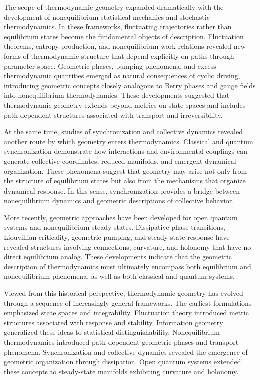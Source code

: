 The scope of thermodynamic geometry expanded dramatically with the development of nonequilibrium statistical mechanics and stochastic thermodynamics. In these frameworks, fluctuating trajectories rather than equilibrium states become the fundamental objects of description. Fluctuation theorems, entropy production, and nonequilibrium work relations revealed new forms of thermodynamic structure that depend explicitly on paths through parameter space. Geometric phases, pumping phenomena, and excess thermodynamic quantities emerged as natural consequences of cyclic driving, introducing geometric concepts closely analogous to Berry phases and gauge fields into nonequilibrium thermodynamics. These developments suggested that thermodynamic geometry extends beyond metrics on state spaces and includes path-dependent structures associated with transport and irreversibility.

At the same time, studies of synchronization and collective dynamics revealed another route by which geometry enters thermodynamics. Classical and quantum synchronization demonstrate how interactions and environmental couplings can generate collective coordinates, reduced manifolds, and emergent dynamical organization. These phenomena suggest that geometry may arise not only from the structure of equilibrium states but also from the mechanisms that organize dynamical response. In this sense, synchronization provides a bridge between nonequilibrium dynamics and geometric descriptions of collective behavior.

More recently, geometric approaches have been developed for open quantum systems and nonequilibrium steady states. Dissipative phase transitions, Liouvillian criticality, geometric pumping, and steady-state response have revealed structures involving connections, curvature, and holonomy that have no direct equilibrium analog. These developments indicate that the geometric description of thermodynamics must ultimately encompass both equilibrium and nonequilibrium phenomena, as well as both classical and quantum systems.

Viewed from this historical perspective, thermodynamic geometry has evolved through a sequence of increasingly general frameworks. The earliest formulations emphasized state spaces and integrability. Fluctuation theory introduced metric structures associated with response and stability. Information geometry generalized these ideas to statistical distinguishability. Nonequilibrium thermodynamics introduced path-dependent geometric phases and transport phenomena. Synchronization and collective dynamics revealed the emergence of geometric organization through dissipation. Open quantum systems extended these concepts to steady-state manifolds exhibiting curvature and holonomy.

